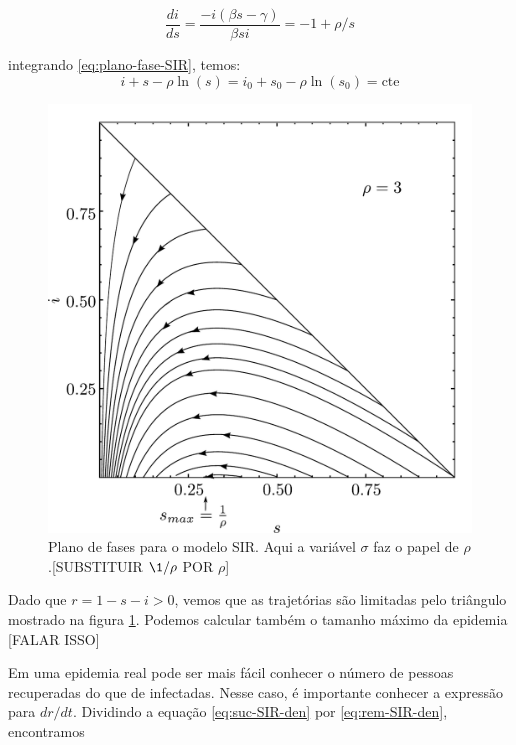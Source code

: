 \documentclass[a4paper,11pt]{report}
\begin{document}
\begin{equation}
\frac{di}{ds}=\frac{-i(\beta s -\gamma)}{\beta si}=-1 + \rho/s
\label{eq:si-rel}
\end{equation}

integrando \ref{eq:plano-fase-SIR}, temos:
\begin{equation}
i+s-\rho\ln(s)=i_0+s_0-\rho\ln(s_0)=\mbox{cte}
\label{eq:plano-fase-SIR}
\end{equation}

\begin{figure}[ht!]
\begin{center}
\includegraphics[scale=0.6]{./images/SIR-trial}
\end{center}
\caption{Plano de fases para o modelo SIR. Aqui a vari\'avel $\sigma$ faz o papel de $\rho$.[SUBSTITUIR $\1/\rho$ POR $\rho$]}
\label{fig:SIR-phase-diagram}
\end{figure}

Dado que $r=1-s-i>0$, vemos que as trajet\'orias s\~ao limitadas pelo tri\^angulo mostrado na figura \ref{fig:SIR-phase-diagram}. Podemos calcular tamb\'em o tamanho m\'aximo da epidemia [FALAR ISSO]


Em uma epidemia real pode ser mais f\'acil conhecer o n\'umero de pessoas recuperadas do que de infectadas. Nesse caso, \'e importante conhecer a express\~ao para $dr/dt$. Dividindo a equa\c{c}\~ao \ref{eq:suc-SIR-den} por \ref{eq:rem-SIR-den}, encontramos
\end{document}
